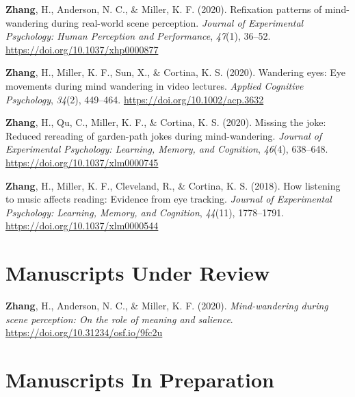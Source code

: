 \documentclass[11pt, a4paper]{awesome-cv}
\begin{document}
\begingroup
\setlength{\parindent}{-0.5in}
\setlength{\leftskip}{0.5in}

\hypertarget{refs_published}{}
\leavevmode\hypertarget{ref-zhang_scan-paths_2020}{}%
\textbf{Zhang}, H., Anderson, N. C., \& Miller, K. F. (2020). Refixation
patterns of mind-wandering during real-world scene perception.
\emph{Journal of Experimental Psychology: Human Perception and
Performance}, \emph{47}(1), 36--52.
\url{https://doi.org/10.1037/xhp0000877}

\leavevmode\hypertarget{ref-zhang_wandering_2020}{}%
\textbf{Zhang}, H., Miller, K. F., Sun, X., \& Cortina, K. S. (2020).
Wandering eyes: Eye movements during mind wandering in video lectures.
\emph{Applied Cognitive Psychology}, \emph{34}(2), 449--464.
\url{https://doi.org/10.1002/acp.3632}

\leavevmode\hypertarget{ref-zhang_missing_2019}{}%
\textbf{Zhang}, H., Qu, C., Miller, K. F., \& Cortina, K. S. (2020).
Missing the joke: Reduced rereading of garden-path jokes during
mind-wandering. \emph{Journal of Experimental Psychology: Learning,
Memory, and Cognition}, \emph{46}(4), 638--648.
\url{https://doi.org/10.1037/xlm0000745}

\leavevmode\hypertarget{ref-zhang_how_2018}{}%
\textbf{Zhang}, H., Miller, K. F., Cleveland, R., \& Cortina, K. S.
(2018). How listening to music affects reading: Evidence from eye
tracking. \emph{Journal of Experimental Psychology: Learning, Memory,
and Cognition}, \emph{44}(11), 1778--1791.
\url{https://doi.org/10.1037/xlm0000544}

\endgroup

\hypertarget{manuscripts-under-review}{%
\section{Manuscripts Under Review}\label{manuscripts-under-review}}

\begingroup
\setlength{\parindent}{-0.5in}
\setlength{\leftskip}{0.5in}

\hypertarget{refs_underreview}{}
\leavevmode\hypertarget{ref-zhang_meaning_2020}{}%
\textbf{Zhang}, H., Anderson, N. C., \& Miller, K. F. (2020).
\emph{Mind-wandering during scene perception: On the role of meaning and
salience}. \url{https://doi.org/10.31234/osf.io/9fc2u}

\endgroup

\hypertarget{manuscripts-in-preparation}{%
\section{Manuscripts In Preparation}\label{manuscripts-in-preparation}}
\end{document}
